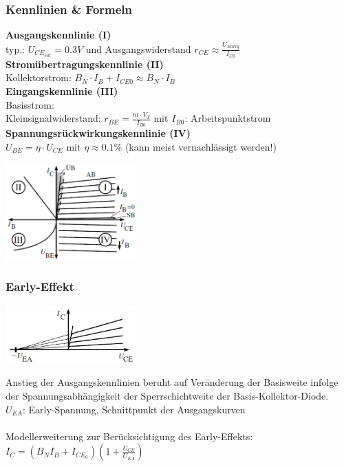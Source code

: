 	\subsubsection{Kennlinien \& Formeln}
		\begin{minipage}[c]{12cm}
			{\bf Ausgangskennlinie (I)}\\
				typ.: $U_{CE_{sat}}=0.3V$ und Ausgangswiderstand $r_{CE} \approx \frac{U_{Early}}{I_{C0}}$\\
				\hspace{2mm}
			{\bf Stromübertragungskennlinie (II)}\\
				Kollektorstrom: $B_N \cdot I_B + I_{CE0} \approx B_N \cdot I_B$\\
				\hspace{2mm}	
			{\bf Eingangskennlinie (III)}\\
				Basisstrom: \\
				Kleinsignalwiderstand: $r_{BE} = \frac{m\cdot V_T}{I_{B0}}$ mit $I_{B0}$: Arbeitspunktstrom\\
				\hspace{2mm}
			{\bf Spannungsrückwirkungskennlinie (IV)}\\
				$U_{BE} = \eta \cdot U_{CE}$ mit $\eta \approx 0.1 \%$ (kann meist vernachlässigt werden!)\\
        \end{minipage}	
		\begin{minipage}[c]{5cm}
			\includegraphics[width=5cm]{./images/BipTraKennlinien.png}
		\end{minipage}
	
	\subsubsection{Early-Effekt}
		\begin{minipage}[c]{5cm}
			\includegraphics[width=5cm]{images/early-effekt}
		\end{minipage}
		\begin{minipage}[c]{12cm}
			Anstieg der Ausgangskennlinien beruht auf Veränderung der Basisweite infolge
			der Spannungsabhängigkeit der Sperrschichtweite der Basis-Kollektor-Diode. \\
			$U_{EA}$: Early-Spannung, Schnittpunkt der Ausgangskurven \\
			\\
			Modellerweiterung zur Berücksichtigung des Early-Effekts: \\
			$I_C = (B_NI_B+I_{CE_0})(1+\frac{U_{CE}}{U_{EA}})$
		\end{minipage}
		

